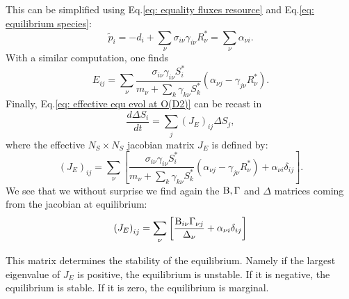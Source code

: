 \documentclass[12pt]{report}
\begin{document}
This can be simplified using Eq.\eqref{eq: equality fluxes resource} and Eq.\eqref{eq: equilibrium species}:
\begin{equation}
\tilde{p}_i=-d_i +\sum_\nu \sigma_{i\nu}\gamma_{i\nu}R^*_\nu = \sum_\nu \alpha_{\nu i}.
\end{equation}
With a similar computation, one finds
\begin{equation}
E_{ij}=\sum_\nu \frac{\sigma_{i\nu}\gamma_{i\nu}S^*_i}{m_\nu+\sum_k \gamma_{k\nu}S^*_k} \left(\alpha_{\nu j}-\gamma_{j\nu}R^*_\nu\right).
\end{equation}
Finally, Eq.\eqref{eq: effective equ evol at O(D2)} can be recast in
\begin{equation}
\frac{d\Delta S_i}{dt} = \sum_j (J_E)_{ij} \Delta S_j,
\end{equation}
where the effective $N_S\times N_S$ jacobian matrix $J_E$ is defined by:
\begin{equation}
(J_E)_{ij}=\sum_\nu \left[\frac{\sigma_{i\nu}\gamma_{i\nu}S^*_i}{m_\nu+\sum_k \gamma_{k\nu}S^*_k} \left(\alpha_{\nu j}-\gamma_{j\nu}R^*_\nu\right)+\alpha_{\nu i}\delta_{ij}\right].
\end{equation}
We see that we without surprise we find again the $\text{B}, \Gamma $ and $\Delta$ matrices coming from the jacobian at equilibrium:
\begin{equation}
\left(J_E\right)_{ij}=\sum_\nu \left[\frac{\text{B}_{i\nu}\Gamma_{\nu j}}{\Delta_\nu}+\alpha_{\nu i} \delta_{ij}\right]
\end{equation}

This matrix determines the stability of the equilibrium. Namely if the largest eigenvalue of $J_E$ is positive, the equilibrium is unstable. If it is negative, the equilibrium is stable. If it is zero, the equilibrium is marginal.
\end{document}
